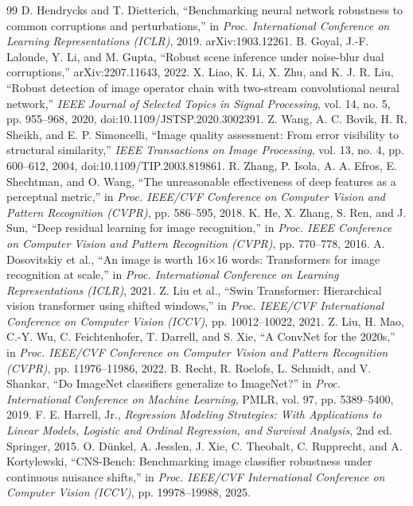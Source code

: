 \documentclass[10pt,twocolumn]{article}
\begin{document}
\balance
\begin{thebibliography}{99}\small
{} D. Hendrycks and T. Dietterich, ``Benchmarking neural network robustness to common corruptions and perturbations,'' in \emph{Proc. International Conference on Learning Representations (ICLR)}, 2019. arXiv:1903.12261.
 B. Goyal, J.-F. Lalonde, Y. Li, and M. Gupta, ``Robust scene inference under noise-blur dual corruptions,'' arXiv:2207.11643, 2022.
 X. Liao, K. Li, X. Zhu, and K. J. R. Liu, ``Robust detection of image operator chain with two-stream convolutional neural network,'' \emph{IEEE Journal of Selected Topics in Signal Processing}, vol. 14, no. 5, pp. 955--968, 2020, doi:10.1109/JSTSP.2020.3002391.
 Z. Wang, A. C. Bovik, H. R. Sheikh, and E. P. Simoncelli, ``Image quality assessment: From error visibility to structural similarity,'' \emph{IEEE Transactions on Image Processing}, vol. 13, no. 4, pp. 600--612, 2004, doi:10.1109/TIP.2003.819861.
 R. Zhang, P. Isola, A. A. Efros, E. Shechtman, and O. Wang, ``The unreasonable effectiveness of deep features as a perceptual metric,'' in \emph{Proc. IEEE/CVF Conference on Computer Vision and Pattern Recognition (CVPR)}, pp. 586--595, 2018.
 K. He, X. Zhang, S. Ren, and J. Sun, ``Deep residual learning for image recognition,'' in \emph{Proc. IEEE Conference on Computer Vision and Pattern Recognition (CVPR)}, pp. 770--778, 2016.
 A. Dosovitskiy et al., ``An image is worth 16$\times$16 words: Transformers for image recognition at scale,'' in \emph{Proc. International Conference on Learning Representations (ICLR)}, 2021.
 Z. Liu et al., ``Swin Transformer: Hierarchical vision transformer using shifted windows,'' in \emph{Proc. IEEE/CVF International Conference on Computer Vision (ICCV)}, pp. 10012--10022, 2021.
 Z. Liu, H. Mao, C.-Y. Wu, C. Feichtenhofer, T. Darrell, and S. Xie, ``A ConvNet for the 2020s,'' in \emph{Proc. IEEE/CVF Conference on Computer Vision and Pattern Recognition (CVPR)}, pp. 11976--11986, 2022.
 B. Recht, R. Roelofs, L. Schmidt, and V. Shankar, ``Do ImageNet classifiers generalize to ImageNet?'' in \emph{Proc. International Conference on Machine Learning}, PMLR, vol. 97, pp. 5389--5400, 2019.
 F. E. Harrell, Jr., \emph{Regression Modeling Strategies: With Applications to Linear Models, Logistic and Ordinal Regression, and Survival Analysis}, 2nd ed. Springer, 2015.
 O. D\"unkel, A. Jesslen, J. Xie, C. Theobalt, C. Rupprecht, and A. Kortylewski, ``CNS-Bench: Benchmarking image classifier robustness under continuous nuisance shifts,'' in \emph{Proc. IEEE/CVF International Conference on Computer Vision (ICCV)}, pp. 19978--19988, 2025.

\end{thebibliography}
\end{document}
